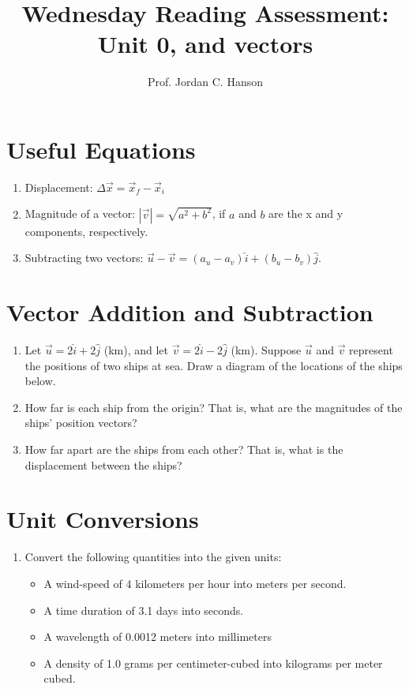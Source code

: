 \documentclass{article}
\begin{document}
\title{Wednesday Reading Assessment: Unit 0, and vectors}
\author{Prof. Jordan C. Hanson}

\maketitle

\section{Useful Equations}

\begin{enumerate}
\item Displacement: $\Delta \vec{x} = \vec{x}_f - \vec{x}_i$
\item Magnitude of a vector: $|\vec{v}| = \sqrt{a^2 + b^2}$, if $a$ and $b$ are the x and y components, respectively.
\item Subtracting two vectors: $\vec{u} - \vec{v} = (a_u - a_v)\hat{i} + (b_u - b_v) \hat{j}$.
\end{enumerate}

\section{Vector Addition and Subtraction}

\begin{enumerate}
\item Let $\vec{u} = 2\hat{i} + 2\hat{j}$ (km), and let $\vec{v} = 2\hat{i} - 2\hat{j}$ (km).  Suppose $\vec{u}$ and $\vec{v}$ represent the positions of two ships at sea.  Draw a diagram of the locations of the ships below. \\ \vspace{2cm}
\item How far is each ship from the origin?  That is, what are the magnitudes of the ships' position vectors? \\ \vspace{1cm}
\item How far apart are the ships from each other? That is, what is the displacement between the ships? \\ \vspace{1cm}
\end{enumerate}

\section{Unit Conversions}

\begin{enumerate}
\item Convert the following quantities into the given units:
\begin{itemize}
\item A wind-speed of 4 kilometers per hour into meters per second.
\item A time duration of 3.1 days into seconds.
\item A wavelength of 0.0012 meters into millimeters
\item A density of 1.0 grams per centimeter-cubed into kilograms per meter cubed.
\end{itemize} 
\end{enumerate}
\end{document}
